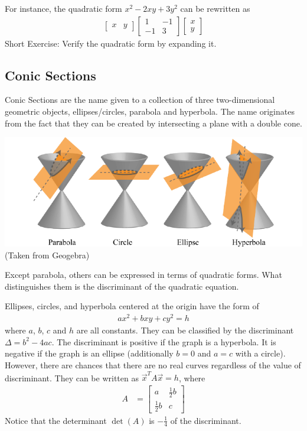 For instance, the quadratic form $x^2 - 2xy + 3y^2$ can be rewritten as
\begin{align*}
\begin{bmatrix}
x & y
\end{bmatrix}
\begin{bmatrix}
1 & -1 \\
-1 & 3
\end{bmatrix}
\begin{bmatrix}
x \\
y
\end{bmatrix}
\end{align*}
Short Exercise: Verify the quadratic form by expanding it.

\subsection{Conic Sections}
\label{Conic}
Conic Sections are the name given to a collection of three two-dimensional geometric objects, ellipses/circles, parabola and hyperbola. The name originates from the fact that they can be created by intersecting a plane with a double cone.
\begin{center}
\includegraphics[scale = 0.5]{ConicSection.png}\\
(Taken from Geogebra)
\end{center}
Except parabola, others can be expressed in terms of quadratic forms. What distinguishes them is the discriminant of the quadratic equation.
\begin{proper}
Ellipses, circles, and hyperbola centered at the origin have the form of
\begin{align*}
ax^2 + bxy + cy^2 = h
\end{align*}
where $a$, $b$, $c$ and $h$ are all constants. They can be classified by the discriminant $\Delta = b^2 - 4ac$. The discriminant is positive if the graph is a hyperbola. It is negative if the graph is an ellipse (additionally $b = 0$ and $a = c$ with a circle). However, there are chances that there are no real curves regardless of the value of discriminant. They can be written as $\vec{x}^TA\vec{x} = h$, where
\begin{align*}
A &= 
\begin{bmatrix}
a & \frac{1}{2}b \\
\frac{1}{2}b & c
\end{bmatrix}
\end{align*}
Notice that the determinant $\det(A)$ is $-\frac{1}{4}$ of the discriminant.
\end{proper}
